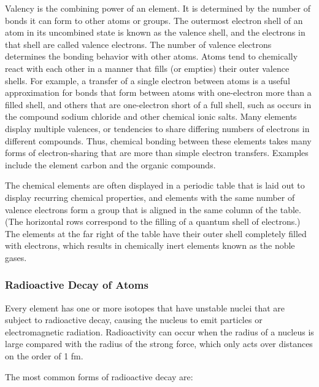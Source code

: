 \documentclass[
]{article}
\begin{document}
Valency is the combining power of an element. It is determined by the
number of bonds it can form to other atoms or groups. The outermost
electron shell of an atom in its uncombined state is known as the
valence shell, and the electrons in that shell are called valence
electrons. The number of valence electrons determines the bonding
behavior with other atoms. Atoms tend to chemically react with each
other in a manner that fills (or empties) their outer valence shells.
For example, a transfer of a single electron between atoms is a useful
approximation for bonds that form between atoms with one-electron more
than a filled shell, and others that are one-electron short of a full
shell, such as occurs in the compound sodium chloride and other chemical
ionic salts. Many elements display multiple valences, or tendencies to
share differing numbers of electrons in different compounds. Thus,
chemical bonding between these elements takes many forms of
electron-sharing that are more than simple electron transfers. Examples
include the element carbon and the organic compounds.

The chemical elements are often displayed in a periodic table that is
laid out to display recurring chemical properties, and elements with the
same number of valence electrons form a group that is aligned in the
same column of the table. (The horizontal rows correspond to the filling
of a quantum shell of electrons.) The elements at the far right of the
table have their outer shell completely filled with electrons, which
results in chemically inert elements known as the noble gases.

\hypertarget{radioactive-decay-of-atoms}{%
\subsubsection{Radioactive Decay of
Atoms}\label{radioactive-decay-of-atoms}}

Every element has one or more isotopes that have unstable nuclei that
are subject to radioactive decay, causing the nucleus to emit particles
or electromagnetic radiation. Radioactivity can occur when the radius of
a nucleus is large compared with the radius of the strong force, which
only acts over distances on the order of 1 fm.

The most common forms of radioactive decay are:
\end{document}
